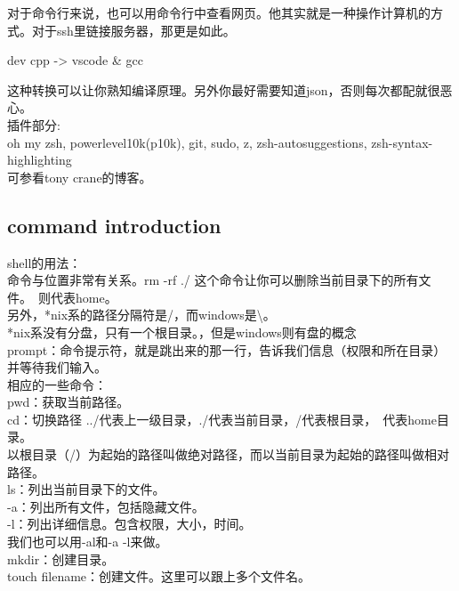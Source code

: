 \documentclass{article}
\begin{document}
\noindent
对于命令行来说，也可以用命令行中查看网页。他其实就是一种操作计算机的方式。对于ssh里链接服务器，那更是如此。\\
\begin{center}
    dev cpp -> vscode \& gcc\\
\end{center}
这种转换可以让你熟知编译原理。另外你最好需要知道json，否则每次都配就很恶心。\\

\noindent
插件部分:\\
oh my zsh, powerlevel10k(p10k), git, sudo, z, zsh-autosuggestions, zsh-syntax-highlighting\\
可参看tony crane的博客。\\

\subsection{command introduction}
\noindent
shell的用法：\\
命令与位置非常有关系。rm -rf ./ 这个命令让你可以删除当前目录下的所有文件。~则代表home。\\
另外，*nix系的路径分隔符是/，而windows是\textbackslash。\\
*nix系没有分盘，只有一个根目录。，但是windows则有盘的概念\\

\noindent
prompt：命令提示符，就是跳出来的那一行，告诉我们信息（权限和所在目录）并等待我们输入。\\

\noindent
相应的一些命令：\\
pwd：获取当前路径。\\
cd：切换路径 ../代表上一级目录，./代表当前目录，/代表根目录，~代表home目录。\\
以根目录（/）为起始的路径叫做绝对路径，而以当前目录为起始的路径叫做相对路径。\\

\noindent
ls：列出当前目录下的文件。\\
\hspace*{2em} -a：列出所有文件，包括隐藏文件。\\
\hspace*{2em} -l：列出详细信息。包含权限，大小，时间。\\
\hspace*{2em} 我们也可以用-al和-a -l来做。\\

\noindent
mkdir：创建目录。\\
touch filename：创建文件。这里可以跟上多个文件名。\\
\end{document}
